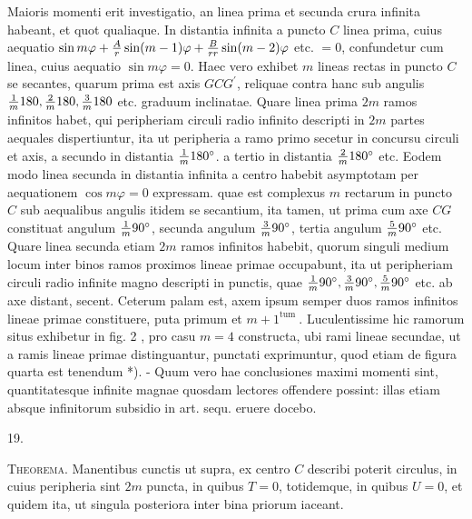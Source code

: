 \documentclass[twoside,12pt, showframe]{memoir}
\let\oldfrac\frac
\def\frac#1#2{\mathchoice{\tfrac{#1}{#2}}{\oldfrac{#1}{#2}}{\genfrac{}{}{}{2}{#1}{#2\mathstrut}}{\genfrac{}{}{}{3}{#1}{#2\mathstrut}}}
\begin{document}
Maioris momenti erit investigatio, an linea prima et secunda crura infinita habeant, et quot qualiaque. In distantia infinita a puncto \(C\) linea prima, cuius aequatio \(\sin m \varphi+\frac{A}{r} \sin (m-1) \varphi+\frac{B}{r r} \sin (m-2) \varphi\) etc. \(=0\), confundetur cum linea, cuius aequatio \(\sin m \varphi=0\). Haec vero exhibet \(m\) lineas rectas in puncto \(C\) se secantes, quarum prima est axis \(G C G^{\prime}\), reliquae contra hanc sub angulis \(\frac{1}{m} 180, \frac{2}{m} 180, \frac{3}{m} 180\) etc. graduum inclinatae. Quare linea prima \(2 m\) ramos infinitos habet, qui peripheriam circuli radio infinito descripti in \(2 m\) partes aequales dispertiuntur, ita ut peripheria a ramo primo secetur in concursu circuli et axis, a secundo in distantia \(\frac{1}{m} 180^{\circ}\). a tertio in distantia \(\frac{2}{m} 180^{\circ}\) etc. Eodem modo linea secunda in distantia infinita a centro habebit asymptotam per aequationem \(\cos m \varphi=0\) expressam. quae est complexus \(m\) rectarum in puncto \(C\) sub aequalibus angulis itidem se secantium, ita tamen, ut prima cum axe \(C G\) constituat angulum \(\frac{1}{m} 90^{\circ}\), secunda angulum \(\frac{3}{m} 90^{\circ}\), tertia angulum \(\frac{5}{m} 90^{\circ}\) etc. Quare linea secunda etiam \(2 m\) ramos infinitos habebit, quorum singuli medium locum inter binos ramos proximos lineae primae occupabunt, ita ut peripheriam circuli radio infinite magno descripti in punctis, quae \(\frac{1}{m} 90^{\circ}, \frac{3}{m} 90^{\circ}, \frac{5}{m} 90^{\circ}\) etc. ab axe distant, secent. Ceterum palam est, axem ipsum semper duos ramos infinitos lineae primae constituere, puta primum et \(m+1^{\text {tum }}\). Luculentissime hic ramorum situs exhibetur in fig. 2 , pro casu \(m=4\) constructa, ubi rami lineae secundae, ut a ramis lineae primae distinguantur, punctati exprimuntur, quod etiam de figura quarta est tenendum *). - Quum vero hae conclusiones maximi momenti sint, quantitatesque infinite magnae quosdam lectores offendere possint: illas etiam absque infinitorum subsidio in art. sequ. eruere docebo.

19.

\textsc{Theorema}. Manentibus cunctis ut supra, ex centro \(C\) describi poterit circulus,
in cuius peripheria sint \(2 m\) puncta, in quibus \(T=0\), totidemque, in quibus \(U=0\), et quidem ita, ut singula posteriora inter bina priorum iaceant.
\end{document}
